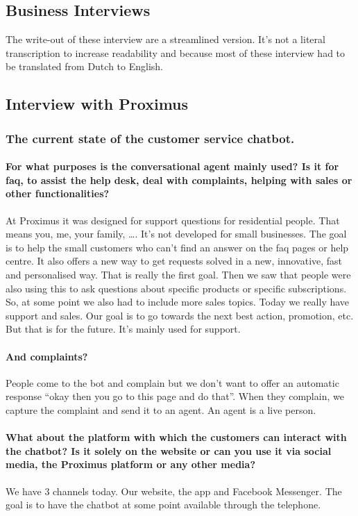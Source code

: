 \begin{appendices}
	\chapter{Business Interviews}
	\label{ch:appendices}
	The write-out of these interview are a streamlined version. It's not a literal transcription to increase readability and because most of these interview had to be translated from Dutch to English.
	
	\section{Interview with Proximus}
	\label{in:Proximus}
	\subsection{The current state of the customer service chatbot.}
	\subsubsection{For what purposes is the conversational agent mainly used? Is it for \acrshort{faq}, to assist the help desk, deal with complaints, helping with sales or other functionalities?}
	At Proximus it was designed for support questions for residential people. That means you, me, your family, …. It’s not developed for small businesses. The goal is to help the small customers who can’t find an answer on the \acrshort{faq} pages or help centre. It also offers a new way to get requests solved in a new, innovative, fast and personalised way. That is really the first goal. Then we saw that people were also using this to ask questions about specific products or specific subscriptions. So, at some point we also had to include more sales topics. Today we really have support and sales. Our goal is to go towards the next best action, promotion, etc. But that is for the future. It’s mainly used for support.
	
	\subsubsection{And complaints?}
	People come to the bot and complain but we don’t want to offer an automatic response “okay then you go to this page and do that”. When they complain, we capture the complaint and send it to an agent. An agent is a live person.
	
	\subsubsection{What about the platform with which the customers can interact with the chatbot? Is it solely on the website or can you use it via social media, the Proximus platform or any other media?}
	We have 3 channels today. Our website, the app and Facebook Messenger. The goal is to have the chatbot at some point available through the telephone.
	

\end{appendices}
